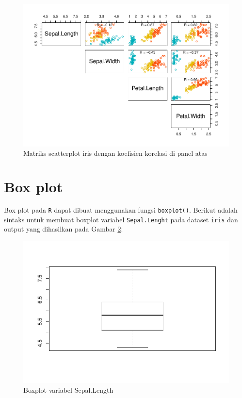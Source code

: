 \documentclass[]{book}
\newenvironment{Shaded}{\begin{snugshade}}{\end{snugshade}}
\newcommand{\KeywordTok}[1]{\textcolor[rgb]{0.13,0.29,0.53}{\textbf{#1}}}
\newcommand{\OperatorTok}[1]{\textcolor[rgb]{0.81,0.36,0.00}{\textbf{#1}}}
\newcommand{\NormalTok}[1]{#1}
\begin{document}
\begin{figure}

{\centering \includegraphics[width=0.8\linewidth]{EnvStat_files/figure-latex/matscat5-1} 

}

\caption{Matriks scatterplot iris dengan koefisien korelasi di panel atas}\label{fig:matscat5}
\end{figure}

\section{Box plot}\label{box-plot}

Box plot pada \texttt{R} dapat dibuat menggunakan fungsi
\texttt{boxplot()}. Berikut adalah sintaks untuk membuat boxplot
variabel \texttt{Sepal.Lenght} pada dataset \texttt{iris} dan output
yang dihasilkan pada Gambar \ref{fig:boxplot}:

\begin{Shaded}
\end{Shaded}

\begin{figure}

{\centering \includegraphics[width=0.7\linewidth]{EnvStat_files/figure-latex/boxplot-1} 

}

\caption{Boxplot variabel Sepal.Length}\label{fig:boxplot}
\end{figure}
\end{document}
